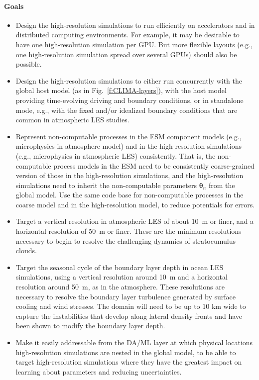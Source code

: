 \documentclass{article}
\renewcommand{\vec}[1]{\boldsymbol{{#1}}}
\begin{document}
\paragraph{Goals}
\begin{itemize}
    \item Design the high-resolution simulations to run efficiently on accelerators and in distributed computing environments.  For example, it may be desirable to have one high-resolution simulation per GPU. But more flexible layouts (e.g., one high-resolution simulation spread over several GPUs) should also be possible.
    \item Design the high-resolution simulations to either run concurrently with the global host model (as in Fig.~\ref{f:CLIMA-layers}), with the host model providing time-evolving driving and boundary conditions, or in standalone mode, e.g., with the fixed and/or idealized boundary conditions that are common in atmospheric LES studies. 
    \item Represent non-computable processes in the ESM component models (e.g., microphysics in atmosphere model) and in the high-resolution simulations (e.g., microphysics in atmospheric LES) consistently. That is, the non-computable process models in the ESM need to be consistently coarse-grained version of those in the high-resolution simulations, and the high-resolution simulations need to inherit the non-computable parameters $\vec{\theta}_n$ from the global model. Use the same code base for non-computable processes in the coarse model and in the high-resolution model, to reduce potentials for errors.
    \item Target a vertical resolution in atmospheric LES of about 10~m or finer, and a horizontal resolution of 50~m or finer. These are the minimum resolutions necessary to begin to resolve the challenging dynamics of stratocumulus clouds. 
    \item Target the seasonal cycle of the boundary layer depth in ocean LES simulations, using a vertical resolution around 10~m and a horizontal resolution around 50~m, as in the atmosphere. These resolutions are necessary to resolve the boundary layer turbulence generated by surface cooling and wind stresses. The domain will need to be up to 10 km wide to capture the instabilities that develop along lateral density fronts and have been shown to modify the boundary layer depth.
    \item Make it easily addressable from the DA/ML layer at which physical locations high-resolution simulations are nested in the global model, to be able to target high-resolution simulations where they have the greatest impact on learning about parameters and reducing uncertainties. 
\end{itemize}
\end{document}
